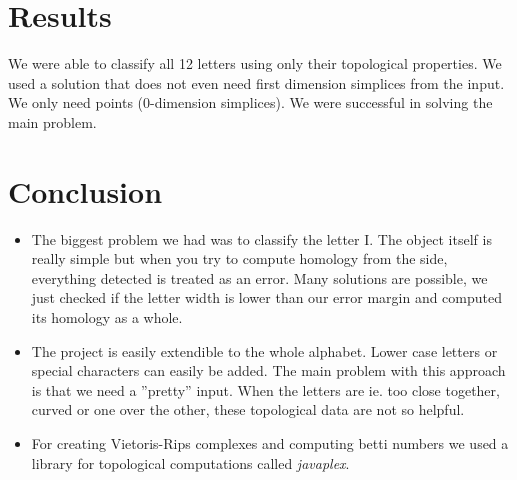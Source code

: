 \documentclass{article}
\begin{document}

\section{Results}
We were able to classify all 12 letters using only their topological properties. We used a solution that does not even need first dimension simplices from the input. We only need points (0-dimension simplices). We were successful in solving the main problem.



\section{Conclusion}
\begin{itemize}
\item The biggest problem we had was to classify the letter I. The object itself is really simple but when you try to compute homology from the side, everything detected is treated as an error. Many solutions are possible, we just checked if the letter width is lower than our error margin and computed its homology as a whole.

\item The project is easily extendible to the whole alphabet. Lower case letters or special characters can easily be added. The main problem with this approach is that we need a ''pretty'' input. When the letters are ie. too close together, curved or one over the other, these topological data are not so helpful.

\item For creating Vietoris-Rips complexes and computing betti numbers we used a library for topological computations called \textit{javaplex}.
\end{itemize}
\end{document}
